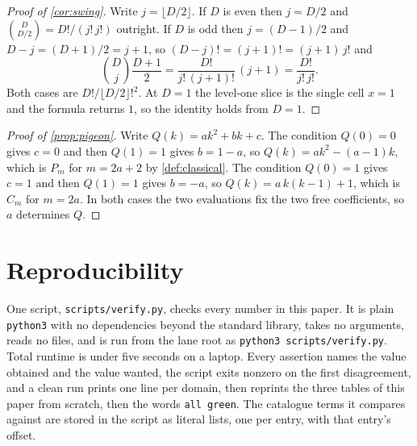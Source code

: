 \documentclass[11pt]{amsart}
\theoremstyle{definition}
\theoremstyle{remark}
\begin{document}
\begin{proof}[Proof of \cref{cor:swing}]
Write $j = \lfloor D/2\rfloor$. If $D$ is even then $j = D/2$ and $\binom{D}{D/2} = D!/(j!\,j!)$ outright. If $D$ is odd then $j = (D-1)/2$ and $D-j = (D+1)/2 = j+1$, so $(D-j)! = (j+1)!= (j+1)\,j!$ and
\[
  \binom{D}{j}\frac{D+1}{2} = \frac{D!}{j!\,(j+1)!}\,(j+1) = \frac{D!}{j!\,j!} .
\]
Both cases are $D!/\lfloor D/2\rfloor!^{2}$. At $D = 1$ the level-one slice is the single cell $x = 1$ and the formula returns $1$, so the identity holds from $D = 1$.
\end{proof}

\begin{proof}[Proof of \cref{prop:pigeon}]
Write $Q(k) = ak^{2}+bk+c$. The condition $Q(0)=0$ gives $c=0$ and then $Q(1)=1$ gives $b = 1-a$, so $Q(k) = ak^{2}-(a-1)k$, which is $P_{m}$ for $m = 2a+2$ by \cref{def:classical}. The condition $Q(0)=1$ gives $c=1$ and then $Q(1)=1$ gives $b=-a$, so $Q(k) = a\,k(k-1)+1$, which is $C_{m}$ for $m = 2a$. In both cases the two evaluations fix the two free coefficients, so $a$ determines $Q$.
\end{proof}

\section{Reproducibility}
\label{sec:repro}

One script, \texttt{scripts/\allowbreak verify.py}, checks every number in this paper. It is plain \texttt{python3} with no dependencies beyond the standard library, takes no arguments, reads no files, and is run from the lane root as \texttt{python3 scripts/\allowbreak verify.py}. Total runtime is under five seconds on a laptop. Every assertion names the value obtained and the value wanted, the script exits nonzero on the first disagreement, and a clean run prints one line per domain, then reprints the three tables of this paper from scratch, then the words \texttt{all green}. The catalogue terms it compares against are stored in the script as literal lists, one per entry, with that entry's offset.
\end{document}
